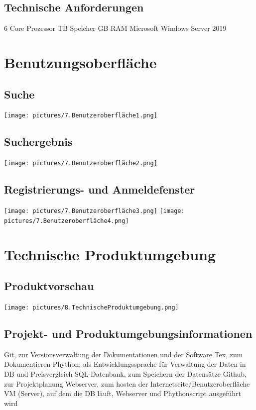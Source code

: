 \subsection{Technische Anforderungen}
6 Core Prozessor  TB Speicher  GB RAM \newline
Microsoft Windows Server 2019 \newline

\section{Benutzungsoberfläche}
\subsection{Suche}
\texttt{[image: pictures/7.Benutzeroberfläche1.png]} 
\subsection{Suchergebnis}
\texttt{[image: pictures/7.Benutzeroberfläche2.png]} \newline \newline
\subsection{Registrierungs- und Anmeldefenster}
\texttt{[image: pictures/7.Benutzeroberfläche3.png]}
\texttt{[image: pictures/7.Benutzeroberfläche4.png]}

\section{Technische Produktumgebung}
\subsection{Produktvorschau}
\texttt{[image: pictures/8.TechnischeProduktumgebung.png]}

\subsection{Projekt- und Produktumgebungsinformationen}
Git, zur Versionsverwaltung der Dokumentationen und der Software \newline
Tex, zum Dokumentieren \newline
Phython, als Entwicklungssprache für Verwaltung der Daten in DB und Preisvergleich \newline
SQL-Datenbank, zum Speichern der Datensätze \newline
Github, zur Projektplanung \newline
Webserver, zum hosten der Internetseite/Benutzeroberfläche \newline
VM (Server), auf dem die DB läuft, Webserver und Phythonscript ausgeführt wird \newline


